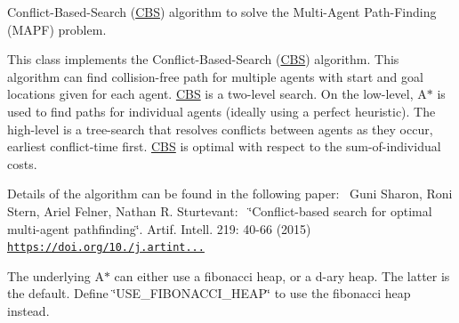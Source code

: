 Conflict-\/\+Based-\/\+Search (\hyperlink{classlib_multi_robot_planning_1_1_c_b_s}{C\+BS}) algorithm to solve the Multi-\/\+Agent Path-\/\+Finding (M\+A\+PF) problem. 

This class implements the Conflict-\/\+Based-\/\+Search (\hyperlink{classlib_multi_robot_planning_1_1_c_b_s}{C\+BS}) algorithm. This algorithm can find collision-\/free path for multiple agents with start and goal locations given for each agent. \hyperlink{classlib_multi_robot_planning_1_1_c_b_s}{C\+BS} is a two-\/level search. On the low-\/level, A$\ast$ is used to find paths for individual agents (ideally using a perfect heuristic). The high-\/level is a tree-\/search that resolves conflicts between agents as they occur, earliest conflict-\/time first. \hyperlink{classlib_multi_robot_planning_1_1_c_b_s}{C\+BS} is optimal with respect to the sum-\/of-\/individual costs.

Details of the algorithm can be found in the following paper\+:~\newline
Guni Sharon, Roni Stern, Ariel Felner, Nathan R. Sturtevant\+:~\newline
\char`\"{}\+Conflict-\/based search for optimal multi-\/agent pathfinding\char`\"{}. Artif. Intell. 219\+: 40-\/66 (2015)~\newline
\href{https://doi.org/10.1016/j.artint.2014.11.006}{\tt https\+://doi.\+org/10./j.\+artint...}

The underlying A$\ast$ can either use a fibonacci heap, or a d-\/ary heap. The latter is the default. Define \char`\"{}\+U\+S\+E\+\_\+\+F\+I\+B\+O\+N\+A\+C\+C\+I\+\_\+\+H\+E\+A\+P\char`\"{} to use the fibonacci heap instead.


